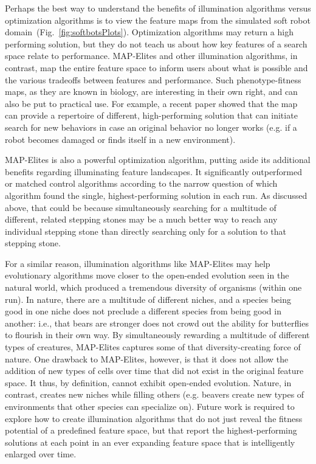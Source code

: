 \documentclass[twocolumn, DIV25, 9pt]{scrartcl}
\begin{document}
Perhaps the best way to understand the benefits of illumination algorithms versus optimization algorithms is to view the feature maps from the simulated soft robot domain~(Fig.~\ref{fig:softbotsPlots}). Optimization algorithms may return a high performing solution, but they do not teach us about how key features of a search space relate to performance. MAP-Elites and other illumination algorithms, in contrast, map the entire feature space to inform users about what is possible and the various tradeoffs between features and performance. Such phenotype-fitness maps, as they are known in biology\cite{bull2011phenotype}, are interesting in their own right, and can also be put to practical use. For example, a recent paper showed that the map can provide a repertoire of different, high-performing solution that can initiate search for new behaviors in case an original behavior no longer works (e.g. if a robot becomes damaged or finds itself in a new environment)\cite{cully2015robots}.

MAP-Elites is also a powerful optimization algorithm, putting aside its additional benefits regarding illuminating feature landscapes. It significantly outperformed or matched control algorithms according to the narrow question of which algorithm found the single, highest-performing solution in each run. As discussed above, that could be because simultaneously searching for a multitude of different, related stepping stones may be a much better way to reach any individual stepping stone than directly searching only for a solution to that stepping stone\cite{nguyen2015introducing}. 

For a similar reason, illumination algorithms like MAP-Elites may help evolutionary algorithms move closer to the open-ended evolution seen in the natural world, which produced a tremendous diversity of organisms (within one run). In nature, there are a multitude of different niches, and a species being good in one niche does not preclude a different species from being good in another: i.e., that bears are stronger does not crowd out the ability for butterflies to flourish in their own way\cite{lehman2011evolving}. By simultaneously rewarding a multitude of different types of creatures, MAP-Elites captures some of that diversity-creating force of nature. One drawback to MAP-Elites, however, is that it does not allow the addition of new types of cells over time that did not exist in the original feature space. It thus, by definition, cannot exhibit open-ended evolution. Nature, in contrast, creates new niches while filling others (e.g. beavers create new types of environments that other species can specialize on). Future work is required to explore how to create illumination algorithms that do not just reveal the fitness potential of a predefined feature space, but that report the highest-performing solutions at each point in an ever expanding feature space that is intelligently enlarged over time.
\end{document}
